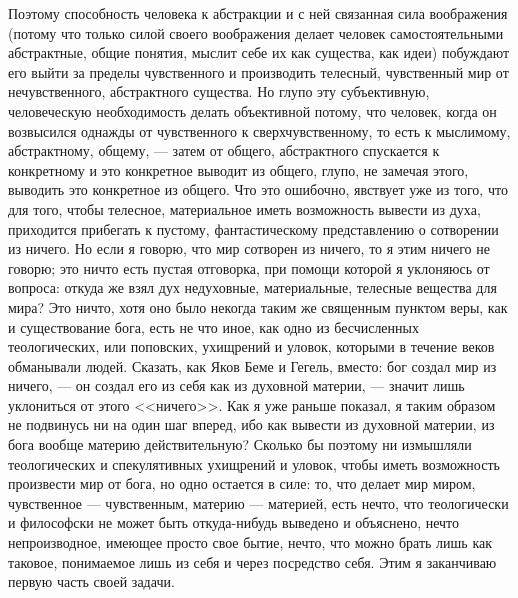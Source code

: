 \documentclass[12pt]{article}
\begin{document}
Поэтому способность человека к абстракции и с ней связанная сила воображения (потому что только силой своего воображения делает человек самостоятельными абстрактные, общие понятия, мыслит себе их как существа, как идеи) побуждают его выйти за пределы чувственного и производить телесный, чувственный мир от нечувственного, абстрактного существа. Но глупо эту субъективную, человеческую необходимость делать объективной потому, что человек, когда он возвысился однажды от чувственного к сверхчувственному, то есть к мыслимому, абстрактному, общему, --- затем от общего, абстрактного спускается к конкретному и это конкретное выводит из общего, глупо, не замечая этого, выводить это конкретное из общего. Что это ошибочно, явствует уже из того, что для того, чтобы телесное, материальное иметь возможность вывести из духа, приходится прибегать к пустому, фантастическому представлению о сотворении из ничего. Но если я говорю, что мир сотворен из ничего, то я этим ничего не говорю; это ничто есть пустая отговорка, при помощи которой я уклоняюсь от вопроса: откуда же взял дух недуховные, материальные, телесные вещества для мира? Это ничто, хотя оно было некогда таким же священным пунктом веры, как и существование бога, есть не что иное, как одно из бесчисленных теологических, или поповских, ухищрений и уловок, которыми в течение веков обманывали людей. Сказать, как Яков Беме и Гегель, вместо: бог создал мир из ничего, --- он создал его из себя как из духовной материи, --- значит лишь уклониться от этого <<ничего>>. Как я уже раньше показал, я таким образом не подвинусь ни на один шаг вперед, ибо как вывести из духовной материи, из бога вообще материю действительную? Сколько бы поэтому ни измышляли теологических и спекулятивных ухищрений и уловок, чтобы иметь возможность произвести мир от бога, но одно остается в силе: то, что делает мир миром, чувственное --- чувственным, материю --- материей, есть нечто, что теологически и философски не может быть откуда-нибудь выведено и объяснено, нечто непроизводное, имеющее просто свое бытие, нечто, что можно брать лишь как таковое, понимаемое лишь из себя и через посредство себя. Этим я заканчиваю первую часть своей задачи. 
\end{document}
